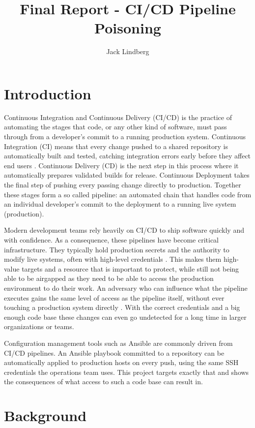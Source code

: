 \documentclass{article}
\title{Final Report - CI/CD Pipeline Poisoning}
\author{Jack Lindberg}
\begin{document}
\maketitle

\section{Introduction}

Continuous Integration and Continuous Delivery (CI/CD) is the practice of automating the stages that code, or any other kind of software, must pass through from a developer's commit to a running production system. Continuous Integration (CI) means that every change pushed to a shared repository is automatically built and tested, catching integration errors early before they affect end users \cite{fowlerCI}. Continuous Delivery (CD) is the next step in this process where it automatically prepares validated builds for release. Continuous Deployment takes the final step of pushing every passing change directly to production. Together these stages form a so called pipeline: an automated chain that handles code from an individual developer's commit to the deployment to a running live system (production).

Modern development teams rely heavily on CI/CD to ship software quickly and with confidence. As a consequence, these pipelines have become critical infrastructure. They typically hold production secrets and the authority to modify live systems, often with high-level credentials \cite{owaspPPE5}. This makes them high-value targets and a resource that is important to protect, while still not being able to be airgapped as they need to be able to access the production environment to do their work. An adversary who can influence what the pipeline executes gains the same level of access as the pipeline itself, without ever touching a production system directly \cite{owaspPPE}. With the correct credentials and a big enough code base these changes can even go undetected for a long time in larger organizations or teams.

Configuration management tools such as Ansible \cite{ansibleDocs} are commonly driven from CI/CD pipelines. An Ansible playbook committed to a repository can be automatically applied to production hosts on every push, using the same SSH credentials the operations team uses. This project targets exactly that and shows the consequences of what access to such a code base can result in.

\section{Background}
\end{document}
